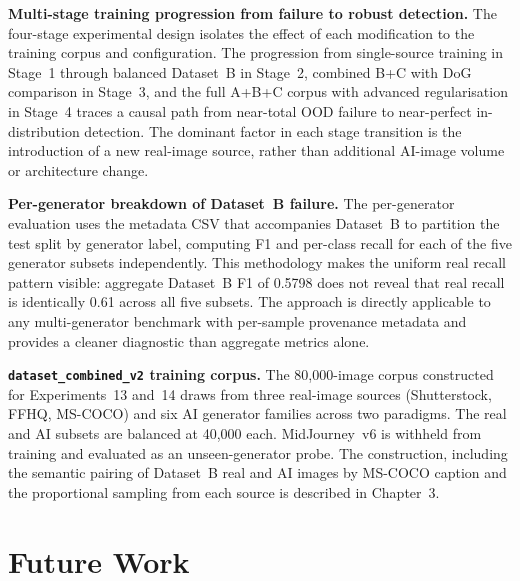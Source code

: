 \textbf{Multi-stage training progression from failure to robust detection.} The
four-stage experimental design isolates the effect of each modification to the training
corpus and configuration. The progression from single-source training in Stage~1 through
balanced Dataset~B in Stage~2, combined B+C with DoG comparison in Stage~3, and the full
A+B+C corpus with advanced regularisation in Stage~4 traces a causal path from near-total
OOD failure to near-perfect in-distribution detection. The dominant factor in each
stage transition is the introduction of a new real-image source, rather than additional
AI-image volume or architecture change.

\textbf{Per-generator breakdown of Dataset~B failure.} The per-generator evaluation
uses the metadata CSV that accompanies Dataset~B to partition the test split by generator
label, computing F1 and per-class recall for each of the five generator subsets
independently. This methodology makes the uniform real recall pattern visible: aggregate
Dataset~B F1 of 0.5798 does not reveal that real recall is identically 0.61 across all
five subsets. The approach is directly applicable to any multi-generator benchmark with
per-sample provenance metadata and provides a cleaner diagnostic than aggregate metrics
alone.

\textbf{\texttt{dataset\_combined\_v2} training corpus.} The 80,000-image corpus
constructed for Experiments~13 and~14 draws from three real-image sources (Shutterstock,
FFHQ, MS-COCO) and six AI generator families across two paradigms. The real and AI
subsets are balanced at 40,000 each. MidJourney~v6 is withheld from training and
evaluated as an unseen-generator probe. The construction, including the semantic pairing
of Dataset~B real and AI images by MS-COCO caption and the proportional sampling from
each source is described in Chapter~3.


\section{Future Work}
\label{sec:future_work}

